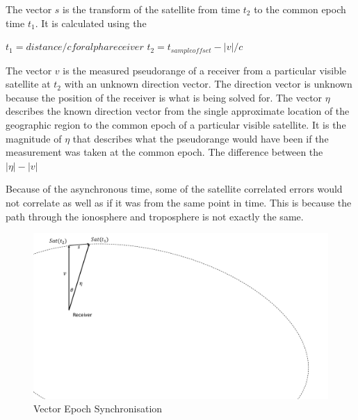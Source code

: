 The vector $s$ is the transform of the satellite from time $t_2$ to the common epoch time $t_1$. It is calculated using the 

$t_1 = distance/c for alpha receiver$
$t_2 = t_{sampleoffset}- |v|/c$

The vector $v$ is the measured pseudorange of a receiver from a particular visible satellite at $t_2$ with an unknown direction vector. The direction vector is unknown because the position of the receiver is what is being solved for. The vector $\eta$ describes the known direction vector from the single approximate location of the geographic region to the common epoch of a particular visible satellite. It is the magnitude of $\eta$ that describes what the pseudorange would have been if the measurement was taken at the common epoch. The difference between the  $|\eta|-|v|$

Because of the asynchronous time, some of the satellite correlated errors would not correlate as well as if it was from the same point in time. This is because the path through the ionosphere and troposphere is not exactly the same. 


\begin{figure}
\centering
\caption{Vector Epoch Synchronisation}
\label{Fig:epochsync}
\includegraphics[trim=0 10cm 23cm 0,clip,width=0.6\linewidth]{ChapterPerception/Figures/epochalignment.pdf}
\end{figure}









